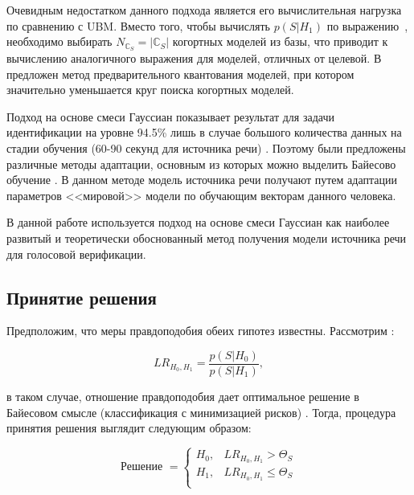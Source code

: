 Очевидным недостатком данного подхода является его вычислительная нагрузка по сравнению с UBM. Вместо того, чтобы вычислять $p(S|H_1)$ по выражению~, необходимо выбирать $N_{\mathbb{C}_S} = |\mathbb{C}_S|$ когортных моделей из базы, что приводит к вычислению аналогичного выражения для  моделей, отличных от целевой. В \cite{Kinnunen04cohort} предложен метод предварительного квантования моделей, при котором значительно уменьшается круг поиска когортных моделей.

Подход на основе смеси Гауссиан показывает результат для задачи идентификации на уровне 94.5\% лишь в случае большого количества данных на стадии обучения (60-90 секунд для источника речи) \cite{Reynolds95gmm}. Поэтому были предложены различные методы адаптации, основным из которых можно выделить Байесово обучение \cite{Reynolds00speakerverification}. В данном методе модель источника речи получают путем адаптации параметров <<мировой>> модели по обучающим векторам данного человека.

В данной работе используется подход на основе смеси Гауссиан как наиболее развитый и теоретически обоснованный метод получения модели источника речи для голосовой верификации.

\subsection{Принятие решения}
\label{sec:analytic:decision}

Предположим, что меры правдоподобия обеих гипотез  известны. Рассмотрим :

\begin{equation}
\label{eq:lr}
LR_{H_0, H_1} = \frac{p(S|H_0)}{p(S|H_1)},
\end{equation}

\noindent в таком случае, отношение правдоподобия дает оптимальное решение в Байесовом смысле (классификация с минимизацией рисков) \cite{Fukunaga90Intro}. Тогда, процедура принятия решения выглядит следующим образом:

\begin{equation}
\label{eq:decision}
\textrm{Решение } = \left\{ 
    \begin{array}{ll}
        H_0, & LR_{H_0, H_1} > \Theta_{S} \\
        H_1, & LR_{H_0, H_1} \leq \Theta_{S} \\
    \end{array}
\right.
\end{equation}

